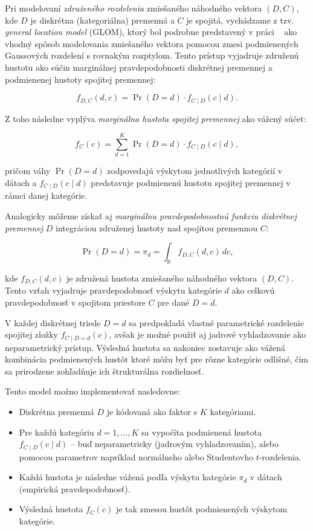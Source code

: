 Pri modelovaní \textit{združeného rozdelenia} zmiešaného náhodného vektora $(D, C)$, kde $D$ je diskrétna (kategoriálna) premenná a $C$ je spojitá, vychádzame z tzv. \textit{general location model} (GLOM), ktorý bol podrobne predstavený v práci ~\textcite{pleisMixtureDissertation} ako vhodný spôsob modelovania zmiešaného vektora pomocou zmesi podmienených Gaussových rozdelení s rovnakým rozptylom. Tento prístup vyjadruje združenú hustotu ako súčin marginálnej pravdepodobnosti diskrétnej premennej a podmienenej hustoty spojitej premennej:

\begin{equation}
f_{D,C}(d, c) = \Pr(D = d) \cdot f_{C \mid D}(c \mid d).
\end{equation}

Z toho následne vyplýva \textit{marginálna hustota spojitej premennej} ako vážený súčet:

\begin{equation}
f_C(c) = \sum_{d=1}^{K} \Pr(D = d) \cdot f_{C \mid D}(c \mid d),
\end{equation}

pričom váhy $\Pr(D = d)$ zodpovedajú výskytom jednotlivých kategórií v dátach a $f_{C \mid D}(c \mid d)$ predstavuje podmienenú hustotu spojitej premennej v rámci danej kategórie.

Analogicky môžeme získať aj \textit{marginálnu pravdepodobnostnú funkciu diskrétnej premennej} $D$ integráciou združenej hustoty nad spojitou premennou $C$:

\begin{equation}
\Pr(D = d) = \pi_d = \int_{\mathbb{R}} f_{D,C}(d, c) \, dc,
\end{equation}

kde $f_{D,C}(d, c)$ je združená hustota zmiešaného náhodného vektora $(D, C)$. Tento vzťah vyjadruje pravdepodobnosť výskytu kategórie $d$ ako celkovú pravdepodobnosť v spojitom priestore $C$ pre dané $D = d$.

V každej diskrétnej triede $D = d$ sa predpokladá vlastné parametrické rozdelenie spojitej zložky $f_{C \mid D=d}(c)$, avšak je možné použiť aj jadrové vyhladzovanie ako neparametrický prístup. Výsledná hustota sa nakoniec zostavuje ako vážená kombinácia podmienených hustôt ktoré môžu byť pre rôzne kategórie odlišné, čím sa prirodzene zohľadňuje ich štrukturálna rozdielnosť.

Tento model možno implementovať nasledovne:
\begin{itemize}
  \item Diskrétna premenná $D$ je kódovaná ako faktor s $K$ kategóriami.
  \item Pre každú kategóriu $d = 1, \dots, K$ sa vypočíta podmienená hustota $f_{C \mid D}(c \mid d)$ – buď neparametricky (jadrovým vyhladzovaním), alebo pomocou parametrov napríklad normálneho alebo Studentovho $t$-rozdelenia.
  \item Každá hustota je následne vážená podľa výskytu kategórie $\pi_d$ v dátach (empirická pravdepodobnosť).
  \item Výsledná hustota $f_C(c)$ je tak zmesou hustôt podmienených výskytom kategórie.
\end{itemize}

